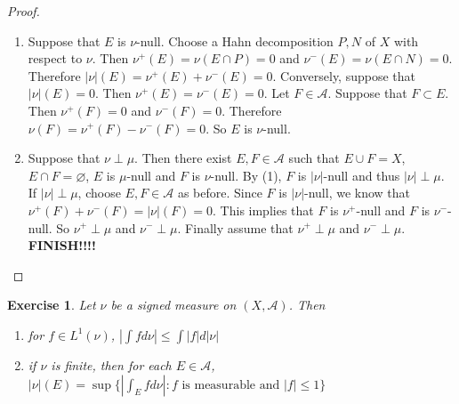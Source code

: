 \documentclass[12pt]{amsart}
\newtheorem{ex}[thm]{Exercise}
\newcommand{\MA}{\mathcal{A}}
\begin{document}
\begin{proof}
\begin{enumerate}
\item Suppose that $E$ is $\nu$-null. Choose a Hahn decomposition $P,N$ of $X$ with respect to $\nu$. Then $\nu^+(E) = \nu(E \cap P) = 0$ and $\nu^-(E) = \nu(E \cap N) = 0$. Therefore $|\nu|(E) = \nu^+(E) + \nu^-(E) = 0$. Conversely, suppose that $|\nu|(E) = 0$. Then $\nu^+(E) = \nu^-(E) = 0$. Let $F \in \MA$. Suppose that $F \subset E$. Then $\nu^+(F) = 0$ and $\nu^-(F) = 0$. Therefore $\nu(F) = \nu^+(F) - \nu^-(F) = 0$. So $E$ is $\nu$-null.

\item Suppose that $\nu \perp \mu$. Then there exist $E,F \in \MA$ such that $E \cup F = X$, $E \cap F = \varnothing$, $E$ is $\mu$-null and $F$ is $\nu$-null. By (1), $F$ is $|\nu|$-null and thus $|\nu| \perp \mu$. If $|\nu| \perp \mu$, choose $E,F \in \MA$ as before. Since $F$ is $|\nu|$-null, we know that $\nu^+(F) + \nu^-(F) = |\nu|(F) = 0$. This implies that $F$ is $\nu^+$-null and $F$ is $\nu^-$-null. So $\nu^+ \perp \mu$ and $\nu^- \perp \mu$. Finally assume that $\nu^+ \perp \mu$ and $\nu^- \perp \mu$. \textbf{FINISH!!!!}

\end{enumerate}
\end{proof}

\begin{ex}
Let $\nu$ be a signed measure on $(X, \MA)$. Then 
\begin{enumerate}
\item for $f \in L^1(\nu)$, $|\int f d \nu| \leq \int |f| d |\nu|$
\item if $\nu$ is finite, then for each $E \in \MA$, $|\nu|(E) = \sup \{|\int_E f d \nu |: f  \text{ is measurable and } |f| \leq 1 \}$
\end{enumerate}
\end{ex}
\end{document}
